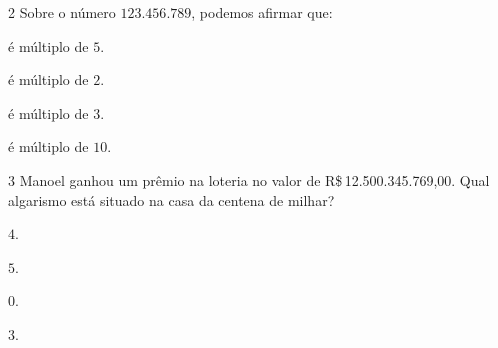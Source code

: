 





\num{2} Sobre o número $123.456.789$, podemos afirmar que:

\begin{escolha}[itemsep=0pt]
\item é múltiplo de $5$.
\item é múltiplo de $2$.
\item é múltiplo de $3$.
\item é múltiplo de $10$.
\end{escolha}








\num{3} Manoel ganhou um prêmio na loteria no valor de R\$\,12.500.345.769,00.
Qual algarismo está situado na casa da centena de milhar?

\begin{escolha}[itemsep=0pt]
\item $4$.
\item $5$.
\item $0$.
\item $3$.
\end{escolha}



